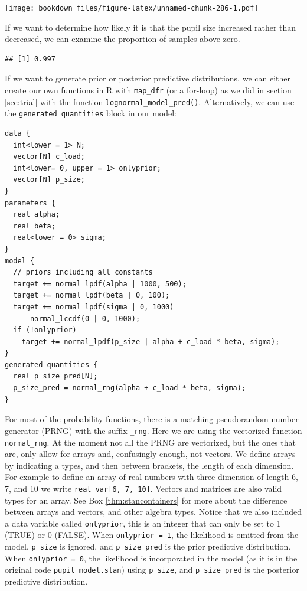 \documentclass[12pt,]{krantz}
\newenvironment{Shaded}{\begin{snugshade}}{\end{snugshade}}
\newcommand{\CommentTok}[1]{\textcolor[rgb]{0.56,0.35,0.01}{\textit{#1}}}
\newcommand{\DecValTok}[1]{\textcolor[rgb]{0.00,0.00,0.81}{#1}}
\newcommand{\KeywordTok}[1]{\textcolor[rgb]{0.13,0.29,0.53}{\textbf{#1}}}
\newcommand{\NormalTok}[1]{#1}
\newcommand{\OperatorTok}[1]{\textcolor[rgb]{0.81,0.36,0.00}{\textbf{#1}}}
\newcommand{\StringTok}[1]{\textcolor[rgb]{0.31,0.60,0.02}{#1}}
\theoremstyle{definition}
\theoremstyle{definition}
\theoremstyle{definition}
\theoremstyle{remark}
\begin{document}
\texttt{[image: bookdown\_files/figure-latex/unnamed-chunk-286-1.pdf]}

If we want to determine how likely it is that the pupil size increased rather than decreased, we can examine the proportion of samples above zero.

\begin{Shaded}
\end{Shaded}

\begin{verbatim}
## [1] 0.997
\end{verbatim}

If we want to generate prior or posterior predictive distributions, we can either create our own functions in R with \texttt{map\_dfr} (or a for-loop) as we did in section \ref{sec:trial} with the function \texttt{lognormal\_model\_pred()}. Alternatively, we can use the \texttt{generated\ quantities} block in our model:

\begin{verbatim}
data {
  int<lower = 1> N;
  vector[N] c_load;
  int<lower= 0, upper = 1> onlyprior;
  vector[N] p_size;
}
parameters {
  real alpha;
  real beta;
  real<lower = 0> sigma;
}
model {
  // priors including all constants
  target += normal_lpdf(alpha | 1000, 500);
  target += normal_lpdf(beta | 0, 100);
  target += normal_lpdf(sigma | 0, 1000)
    - normal_lccdf(0 | 0, 1000);
  if (!onlyprior)
    target += normal_lpdf(p_size | alpha + c_load * beta, sigma);
}
generated quantities {
  real p_size_pred[N];
  p_size_pred = normal_rng(alpha + c_load * beta, sigma);
}
\end{verbatim}

For most of the probability functions, there is a matching pseudorandom number generator (PRNG) with the suffix \texttt{\_rng}. Here we are using the vectorized function \texttt{normal\_rng}. At the moment not all the PRNG are vectorized, but the ones that are, only allow for arrays and, confusingly enough, not vectors. We define arrays by indicating a types, and then between brackets, the length of each dimension. For example to define an array of real numbers with three dimension of length 6, 7, and 10 we write \texttt{real\ var{[}6,\ 7,\ 10{]}}. Vectors and matrices are also valid types for an array. See Box \ref{thm:stancontainers} for more about the difference between arrays and vectors, and other algebra types. Notice that we also included a data variable called \texttt{onlyprior}, this is an integer that can only be set to 1 (TRUE) or 0 (FALSE). When \texttt{onlyprior\ =\ 1}, the likelihood is omitted from the model, \texttt{p\_size} is ignored, and \texttt{p\_size\_pred} is the prior predictive distribution. When \texttt{onlyprior\ =\ 0}, the likelihood is incorporated in the model (as it is in the original code \texttt{pupil\_model.stan}) using \texttt{p\_size}, and \texttt{p\_size\_pred} is the posterior predictive distribution.
\end{document}
